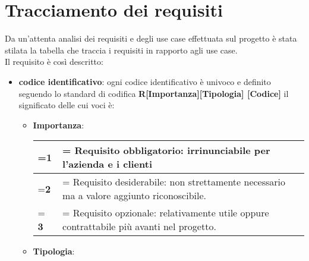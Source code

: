 \newpage             
            
\section{Tracciamento dei requisiti}

Da un'attenta analisi dei requisiti e degli use case effettuata sul progetto è stata stilata la tabella che traccia i requisiti in rapporto agli use case.\\
Il requisito è così descritto:
    \begin{itemize}
    \setlength\itemsep{1em}

        \item \textbf{codice identificativo}: ogni codice 				identificativo è univoco e definito seguendo lo 					standard di codifica \textbf{R[Importanza][Tipologia]				[Codice]}  il significato delle cui voci è:
        \begin{itemize}
        \setlength\itemsep{1em}

            \item \textbf{Importanza}:
            \begin{center}
                
                \renewcommand{\arraystretch}{1.8}
                \renewcommand\tabularxcolumn[1]{m{#1}}
                \begin{tabularx}{0.85\textwidth} {
                    >{\hsize=0.1\hsize\linewidth=\hsize}X
                    >{\hsize=1.9\hsize\linewidth=\hsize}X
                }
                    \hline
                    \textbf{1} & Requisito obbligatorio: 								irrinunciabile per l'azienda e i clienti \\
                    \hline
                    \textbf{2} & Requisito desiderabile: non 							strettamente necessario ma  a valore 							aggiunto riconoscibile. \\
                    \hline
                    \textbf{3} &  Requisito opzionale: 								relativamente utile oppure contrattabile 							più avanti nel progetto. \\
                    \hline
                \end{tabularx}
                \smallskip
            \end{center}
			
            \item \textbf{Tipologia}:
            \begin{center}
                

\end{center}
\end{itemize}
\end{itemize}
